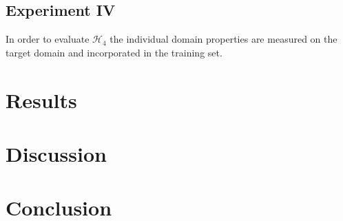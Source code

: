 \subsection{Experiment IV}

In order to evaluate $\mathcal{H}_4$ the individual domain properties are measured on the target domain and incorporated in the training set.


\section{Results}
\label{sec:training:results}

\section{Discussion}
\label{sec:training:discussion}

\section{Conclusion}
\label{sec:training:conclusion}


